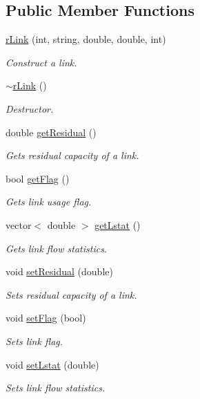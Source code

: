 \subsection*{Public Member Functions}
\begin{DoxyCompactItemize}
\item 
\hyperlink{classrLink_acd7f5f66409693e86cd33e4a6e6964b8}{rLink} (int, string, double, double, int)
\begin{DoxyCompactList}\small\item\em Construct a link. \item\end{DoxyCompactList}\item 
\hyperlink{classrLink_ac2f6e30278ba2967b96086435711f672}{$\sim$rLink} ()
\begin{DoxyCompactList}\small\item\em Destructor. \item\end{DoxyCompactList}\item 
double \hyperlink{classrLink_aa840b5668425c224a451ec1663754a82}{getResidual} ()
\begin{DoxyCompactList}\small\item\em Gets residual capacity of a link. \item\end{DoxyCompactList}\item 
bool \hyperlink{classrLink_a4639d6b69acbb669d0cbb7af5cbf152b}{getFlag} ()
\begin{DoxyCompactList}\small\item\em Gets link usage flag. \item\end{DoxyCompactList}\item 
vector$<$ double $>$ \hyperlink{classrLink_a86c80f0a22f7703601d8a242c2fb471f}{getLstat} ()
\begin{DoxyCompactList}\small\item\em Gets link flow statistics. \item\end{DoxyCompactList}\item 
void \hyperlink{classrLink_a7ac5fdbd1b4fc92cbfd5d8e421477148}{setResidual} (double)
\begin{DoxyCompactList}\small\item\em Sets residual capacity of a link. \item\end{DoxyCompactList}\item 
void \hyperlink{classrLink_a15022659ea92d086138f817203ede689}{setFlag} (bool)
\begin{DoxyCompactList}\small\item\em Sets link flag. \item\end{DoxyCompactList}\item 
void \hyperlink{classrLink_a719c8cee2887f566dd4e0ca6df81f0de}{setLstat} (double)
\begin{DoxyCompactList}\small\item\em Sets link flow statistics. \item\end{DoxyCompactList}\end{DoxyCompactItemize}


